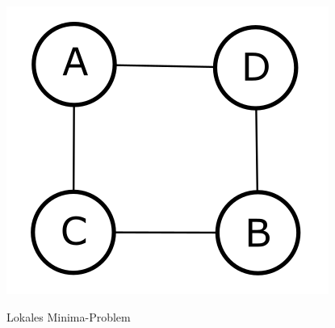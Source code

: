 \begin{figure}[t]
	{\includegraphics[scale=0.5]{bilder/abcdminima2}\label{fig_abcdminima2}
	}
	\\
	\caption[Lokales Minima-Problem]{Lokales Minima-Problem}
	\label{fig_testbild2}
\end{figure}

